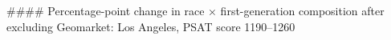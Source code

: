 #### Percentage-point change in race × first-generation composition after excluding Geomarket: Los Angeles, PSAT score 1190–1260
